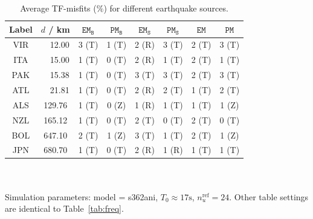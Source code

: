\documentclass[extra,referee]{gji}
\begin{document}
\FloatBarrier
\begin{table}
\begin{minipage}{\columnwidth}
\caption{Average TF-misfits ($\%$) for different earthquake sources.}
\label{tab:cmt}
\setlength{\tabcolsep}{.7cm}
\begin{tabular*}{\textwidth}{cccccccc}
Label & $d$ / km & $\mathtt{EM_B}$ & $\mathtt{PM_B}$ & 
$\mathtt{EM_S}$ & $\mathtt{PM_S}$ & $\mathtt{EM}$ & $\mathtt{PM}$\\[2pt]
\hline
VIR & \ \ 12.00 &
3 {\scriptsize(T)} &
1 {\scriptsize(T)} &
2 {\scriptsize(R)} &
3 {\scriptsize(T)} &
2 {\scriptsize(T)} &
3 {\scriptsize(T)} \\[2pt]
ITA & \ \ 15.00 &
1 {\scriptsize(T)} &
0 {\scriptsize(T)} &
2 {\scriptsize(R)} &
1 {\scriptsize(T)} &
2 {\scriptsize(T)} &
1 {\scriptsize(T)} \\[2pt]
PAK & \ \ 15.38 &
1 {\scriptsize(T)} &
0 {\scriptsize(T)} &
3 {\scriptsize(T)} &
3 {\scriptsize(T)} &
2 {\scriptsize(T)} &
3 {\scriptsize(T)} \\[2pt]
ATL & \ \ 21.81 &
1 {\scriptsize(T)} &
0 {\scriptsize(T)} &
2 {\scriptsize(R)} &
2 {\scriptsize(T)} &
1 {\scriptsize(T)} &
2 {\scriptsize(T)} \\[2pt]
ALS & 129.76 &
1 {\scriptsize(T)} &
0 {\scriptsize(Z)} &
1 {\scriptsize(R)} &
1 {\scriptsize(T)} &
1 {\scriptsize(T)} &
1 {\scriptsize(Z)} \\[2pt]
NZL & 165.12 &
1 {\scriptsize(T)} &
0 {\scriptsize(T)} &
2 {\scriptsize(T)} &
0 {\scriptsize(T)} &
2 {\scriptsize(T)} &
0 {\scriptsize(T)} \\[2pt]
BOL & 647.10 &
2 {\scriptsize(T)} &
1 {\scriptsize(Z)} &
3 {\scriptsize(T)} &
1 {\scriptsize(T)} &
2 {\scriptsize(T)} &
1 {\scriptsize(Z)} \\[2pt]
JPN & 680.70 &
1 {\scriptsize(T)} &
0 {\scriptsize(T)} &
2 {\scriptsize(R)} &
1 {\scriptsize(R)} &
1 {\scriptsize(T)} &
1 {\scriptsize(T)} \\[2pt]
\hline
\end{tabular*}
\\\\
Simulation parameters: model = s362ani, $T_0\approx17\text{s}$, 
$n_u^\text{ref}=24$. Other table settings are identical to 
Table~\ref{tab:freq}.
\end{minipage}
\end{table}
\newpage 
\end{document}
